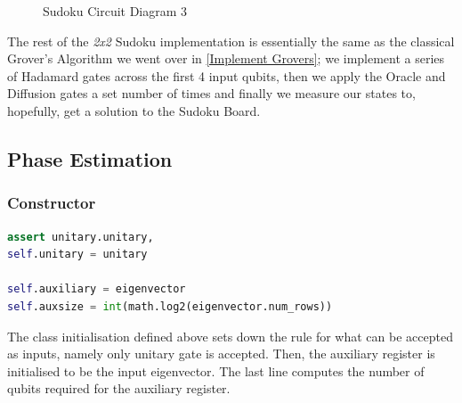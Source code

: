 \documentclass{article}
\begin{document}
\begin{figure}[h]
    \caption{Sudoku Circuit Diagram 3}
    \label{fig:my_label}
\end{figure}

The rest of the \textit{2x2} Sudoku implementation is essentially the same as the classical Grover's Algorithm we went over in \ref{Implement Grovers}; we implement a series of Hadamard gates across the first 4 input qubits, then we apply the Oracle and Diffusion gates a set number of times and finally we measure our states to, hopefully, get a solution to the Sudoku Board.
\pagebreak

\subsection{Phase Estimation}
\subsubsection{Constructor}

\begin{file}
\begin{center}
\begin{lstlisting}[linewidth=13cm,language=Python]
assert unitary.unitary, 
self.unitary = unitary

self.auxiliary = eigenvector
self.auxsize = int(math.log2(eigenvector.num_rows))
\end{lstlisting}
\end{center}
\end{file}
The class initialisation defined above sets down the rule for what can be accepted as inputs, namely only unitary gate is accepted. Then, the auxiliary register is initialised to be the input eigenvector. The last line computes the number of qubits required for the auxiliary register.
\end{document}
